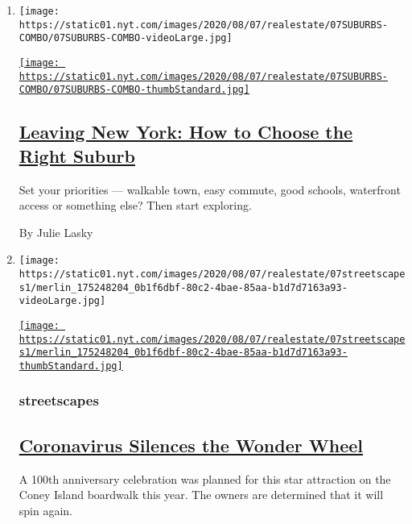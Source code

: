 \begin{enumerate}
\def\labelenumi{\arabic{enumi}.}
\item
  \texttt{[image: https://static01.nyt.com/images/2020/08/07/realestate/07SUBURBS-COMBO/07SUBURBS-COMBO-videoLarge.jpg]}

  \href{/2020/08/07/realestate/coronavirus-escape-suburbs-new-york.html}{\texttt{[image: https://static01.nyt.com/images/2020/08/07/realestate/07SUBURBS-COMBO/07SUBURBS-COMBO-thumbStandard.jpg]}}

  \hypertarget{leaving-new-york-how-to-choose-the-right-suburb}{%
  \subsection{\texorpdfstring{\href{/2020/08/07/realestate/coronavirus-escape-suburbs-new-york.html}{Leaving
  New York: How to Choose the Right
  Suburb}}{Leaving New York: How to Choose the Right Suburb}}\label{leaving-new-york-how-to-choose-the-right-suburb}}

  Set your priorities --- walkable town, easy commute, good schools,
  waterfront access or something else? Then start exploring.

  By Julie Lasky
\item
  \texttt{[image: https://static01.nyt.com/images/2020/08/07/realestate/07streetscapes1/merlin\_175248204\_0b1f6dbf-80c2-4bae-85aa-b1d7d7163a93-videoLarge.jpg]}

  \href{/2020/08/07/realestate/coronavirus-coney-island-wonder-wheel.html}{\texttt{[image: https://static01.nyt.com/images/2020/08/07/realestate/07streetscapes1/merlin\_175248204\_0b1f6dbf-80c2-4bae-85aa-b1d7d7163a93-thumbStandard.jpg]}}

  \hypertarget{streetscapes}{%
  \subsubsection{streetscapes}\label{streetscapes}}

  \hypertarget{coronavirus-silences-the-wonder-wheel}{%
  \subsection{\texorpdfstring{\href{/2020/08/07/realestate/coronavirus-coney-island-wonder-wheel.html}{Coronavirus
  Silences the Wonder
  Wheel}}{Coronavirus Silences the Wonder Wheel}}\label{coronavirus-silences-the-wonder-wheel}}

  A 100th anniversary celebration was planned for this star attraction
  on the Coney Island boardwalk this year. The owners are determined
  that it will spin again.


\end{enumerate}
